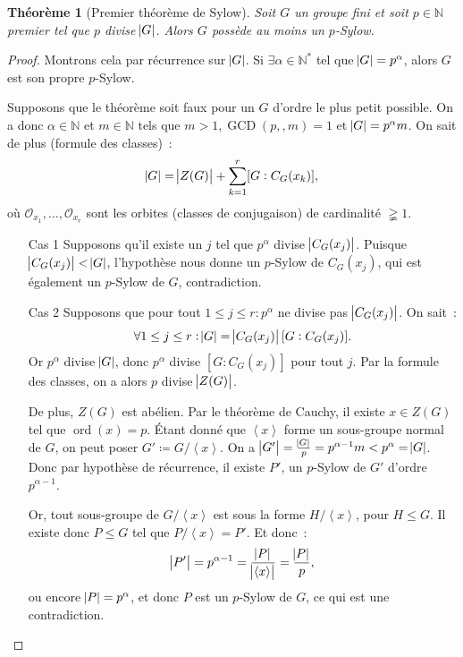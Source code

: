 \documentclass{article}
\newtheorem{thm}{Théorème}[section]
\theoremstyle{definition}
\theoremstyle{remark}
\DeclareMathOperator{\ord}{ord}
\DeclareMathOperator{\GCD}{GCD}
\newcommand{\N}{\mathbb N}
\newcommand{\eng}[1]{\left\langle#1\right\rangle}
\begin{document}
	\begin{thm}[Premier théorème de Sylow] Soit $G$ un groupe fini et soit $p \in \N$ premier tel que $p$ divise $\abs G$. Alors $G$ possède au moins un $p$-Sylow.
	\end{thm}

	\begin{proof} Montrons cela par récurrence sur $\abs G$. Si $\exists \alpha \in \N^*$ tel que $\abs G = p^\alpha$, alors $G$ est son propre $p$-Sylow.

	Supposons que le théorème soit faux pour un $G$ d'ordre le plus petit possible. On a donc $\alpha \in \N$ et $m \in \N$ tels que $m > 1, \GCD(p, ,m) = 1$ et
	$\abs G = p^\alpha m$. On sait de plus (formule des classes)~:
	\[\abs G = \abs {Z(G)} + \sum_{k=1}^r[G:C_G(x_k)],\]
	où $\mathcal O_{x_1}, \ldots, \mathcal O_{x_r}$ sont les orbites (classes de conjugaison) de cardinalité $\gneqq 1$.

	\begin{itemize}
		\item[Cas 1] Supposons qu'il existe un $j$ tel que $p^\alpha$ divise $\abs {C_G(x_j)}$. Puisque $\abs {C_G(x_j)} < \abs G$, l'hypothèse nous donne un
		$p$-Sylow de $C_G(x_j)$, qui est également un $p$-Sylow de $G$, contradiction.

		\item[Cas 2] Supposons que pour tout $1 \leq j \leq r : p^\alpha$ ne divise pas $\abs {C_G(x_j)}$. On sait~:
		\[\forall 1 \leq j \leq r : \abs G = \abs {C_G(x_j)}[G:C_G(x_j)].\]
		Or $p^\alpha$ divise $\abs G$, donc $p^\alpha$ divise $[G:C_G(x_j)]$ pour tout $j$. Par la formule des classes, on a alors $p$ divise $\abs {Z(G)}$.

		De plus, $Z(G)$ est abélien. Par le théorème de Cauchy, il existe $x \in Z(G)$ tel que $\ord(x) = p$. Étant donné que $\eng x$ forme un sous-groupe
		normal de $G$, on peut poser $G' \coloneqq G/\eng x$. On a $\abs {G'} = \frac {\abs G}p = p^{\alpha-1}m < p^\alpha = \abs G$. Donc par hypothèse de
		récurrence, il existe $P'$, un $p$-Sylow de $G'$ d'ordre $p^{\alpha-1}$.

		Or, tout sous-groupe de $G/\eng x$ est sous la forme $H/\eng x$, pour $H \leq G$. Il existe donc $P \leq G$ tel que $P/\eng x = P'$. Et donc~:
		\[\abs {P'} = p^{\alpha-1} = \frac {\abs P}{\abs {\eng x}} = \frac {\abs P}p,\]
		ou encore $\abs P = p^\alpha$, et donc $P$ est un $p$-Sylow de $G$, ce qui est une contradiction.
	\end{itemize}
	\end{proof}
\end{document}
